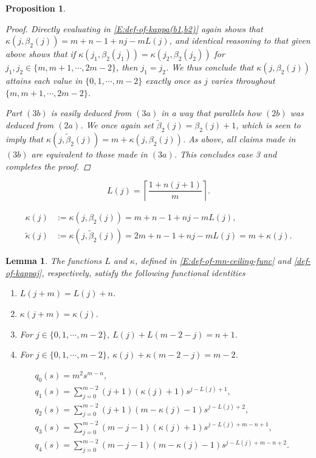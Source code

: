 \documentclass[10pt,a4paper]{amsart}
\newtheorem{proposition}{Proposition}
\newtheorem{lemma}{Lemma}
\begin{document}
\begin{proposition}
\begin{proof}
Directly evaluating in \eqref{E:def-of-kappa(b1,b2)} again shows that $\kappa(j,\beta_2(j)) = m+n-1+nj-mL(j)$, and identical reasoning to that given above shows that if $\kappa(j_1,\beta_2(j_1)) = \kappa(j_2,\beta_2(j_2))$ for $j_1,j_2 \in \{m,m+1,\cdots,2m-2 \}$, then $j_1 = j_2$.
We thus conclude that $\kappa(j,\beta_2(j))$ attains each value in $\{0,1,\cdots,m-2 \}$ exactly once as $j$ varies throughout $\{m,m+1,\cdots,2m-2 \}$.

Part $(3b)$ is easily deduced from $(3a)$ in a way that parallels how $(2b)$ was deduced from $(2a)$.
We once again set $\tilde\beta_2(j) = \beta_2(j)+1$, which is seen to imply that $\kappa(j,\tilde\beta_2(j)) = m + \kappa(j,\beta_2(j))$.
As above, all claims made in $(3b)$ are equivalent to those made in $(3a)$.
This concludes case 3 and completes the proof.
\end{proof}
\end{proposition}

\begin{equation}
L(j) = \left\lceil \frac{1+n(j+1)}{m} \right\rceil.
\end{equation}

\begin{align}
\kappa(j) &:= \kappa(j,\beta_2(j)) = m + n - 1 +nj - mL(j), \label{def-of-kappaj} \\
\tilde\kappa(j) &:= \kappa(j,\tilde\beta_2(j)) = 2m + n - 1 +nj - mL(j) = m + \kappa(j). \label{def-of-kappatildej}
\end{align}

\begin{lemma}\label{L:props-of-L-and-kappa}
The functions $L$ and $\kappa$, defined in \eqref{E:def-of-mn-ceiling-func} and \eqref{def-of-kappaj}, respectively, satisfy the following functional identities
\begin{enumerate}
\item $L(j+m) = L(j) + n$.
\item $\kappa(j+m) = \kappa(j)$.
\item For $j \in \{0,1,\cdots,m-2 \}$, $L(j) + L(m-2-j) = n+1$.
\item For $j \in \{0,1,\cdots,m-2 \}$, $\kappa(j) + \kappa(m-2-j) = m-2$.
\end{enumerate}
\end{lemma}

\begin{align}
&q_0(s) = m^2 s^{m-n}, \label{E:def-of-q0} \\
&q_1(s) = \sum_{j=0}^{m-2} (j+1)(\kappa(j)+1) s^{j-L(j)+1}, \label{E:def-of-q1} \\
&q_2(s) = \sum_{j=0}^{m-2} (j+1)(m-\kappa(j)-1) s^{j-L(j)+2}, \label{E:def-of-q2} \\
&q_3(s) = \sum_{j=0}^{m-2} (m-j-1)(\kappa(j)+1) s^{j-L(j)+m-n+1}, \label{E:def-of-q3} \\
&q_4(s) = \sum_{j=0}^{m-2} (m-j-1)(m-\kappa(j)-1) s^{j-L(j)+m-n+2}. \label{E:def-of-q4} 
\end{align}
\end{document}

